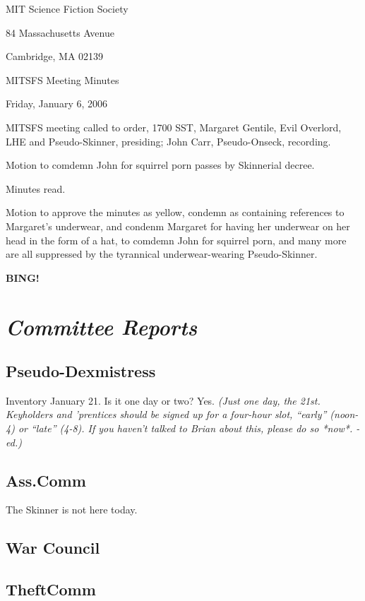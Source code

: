 \documentclass[10pt]{article}
\newcommand{\bing}{{\bf BING!} }
\newcommand{\goto}[1]{\bing \vskip 12pt \section*{{\em{#1}}}}
\begin{document}
\begin{center}

MIT Science Fiction Society

84 Massachusetts Avenue

Cambridge, MA 02139

\vspace{12pt}

MITSFS Meeting Minutes

Friday, January 6, 2006

\end{center}

\vspace{18pt}

\setlength{\parskip}{6pt}

\noindent
MITSFS meeting called to order, 1700 SST,
Margaret Gentile, Evil Overlord, LHE and Pseudo-Skinner, presiding;
John Carr, Pseudo-Onseck, recording.

Motion to comdemn John for squirrel porn passes by Skinnerial decree.

Minutes read.

Motion to approve the minutes as yellow, condemn as containing
references to Margaret's underwear, and condenm Margaret for having
her underwear on her head in the form of a hat, to comdemn John for
squirrel porn, and many more are all suppressed by the tyrannical
underwear-wearing Pseudo-Skinner.

\goto{Committee Reports}

\subsection*{Pseudo-Dexmistress}
Inventory January 21.  Is it one day or two?  Yes.  \emph{(Just one day, the 21st.  Keyholders and
'prentices should be signed up for a four-hour slot, ``early'' (noon-4) or ``late'' (4-8).  If
you haven't talked to Brian about this, please do so *now*. -ed.)}  

\subsection*{Ass.Comm}

The Skinner is not here today.

\subsection*{War Council}

\subsection*{TheftComm}
\end{document}
